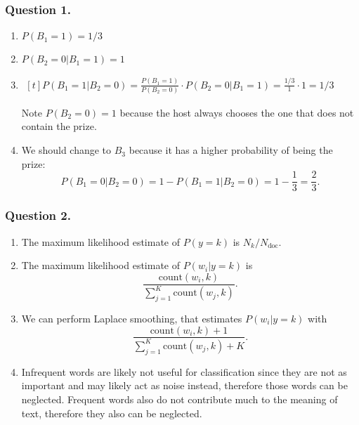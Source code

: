 \documentclass[12pt]{article}
\begin{document}
\subsubsection*{Question 1.}
\begin{enumerate}[{(i)}]
	\item \(P(B_1 = 1) = 1/3\)
	\item \(P(B_2 = 0 | B_1 = 1) = 1\)
	\item \(\begin{aligned}[t]
		      P(B_1 = 1 | B_2 = 0) = \frac{P(B_1 = 1) }{ P(B_2=0)} \cdot P(B_2 = 0 | B_1 = 1) = \frac{1/3}{1}\cdot 1 = 1/3
	      \end{aligned}\)

	      Note \(P(B_2 = 0) = 1\) because the host always chooses the one that does not contain the prize.
	\item We should change to \(B_3\) because it has a higher probability of being the prize:\[
		      P(B_1 = 0 | B_2 = 0) = 1-P(B_1 = 1 | B_2 = 0) = 1 - \frac{1}{3} = \frac{2}{3}.
	      \]

\end{enumerate}

\subsubsection*{Question 2.}
\begin{enumerate}[{(i)}]
	\item The maximum likelihood estimate of \(P(y=k)\) is \(N_k / N_{\text{doc}}\).
	\item The maximum likelihood estimate of \(P(w_i | y=k)\) is \[\frac{\text{count}(w_i, k)}{\sum_{j=1}^K\text{count}(w_j, k)}.\]
	\item We can perform Laplace smoothing, that estimates \(P(w_i | y=k)\) with
	      \[
		      \frac{\text{count}(w_i, k) + 1}{\sum_{j=1}^K\text{count}(w_j, k) + K}.
	      \]
	\item Infrequent words are likely not useful for classification since they are not as important and may likely act as noise instead, therefore those words can be neglected. Frequent words also do not contribute much to the meaning of text, therefore they also can be neglected.
\end{enumerate}
\newpage
\end{document}
